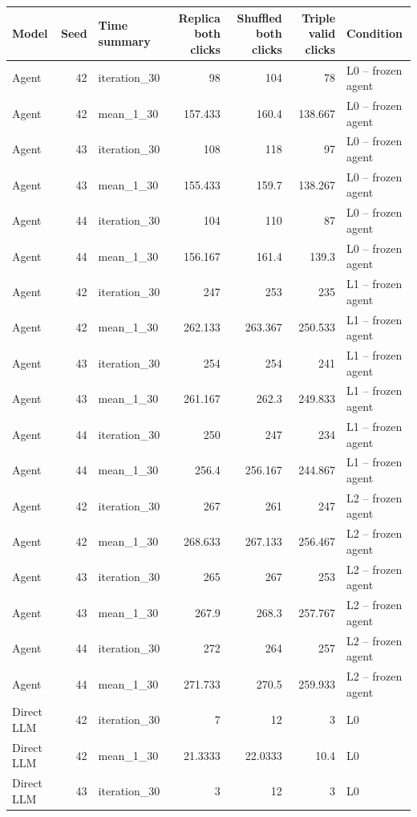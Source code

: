 \begin{table}[htbp!]
\centering
\small
\setlength{\tabcolsep}{3pt}
\renewcommand{\arraystretch}{1.1}
\begin{tabular}{lrlrrrl}
\hline
Model & Seed & Time summary & Replica both clicks & Shuffled both clicks & Triple valid clicks & Condition \\
\hline
Agent & 42 & iteration\_30 & 98 & 104 & 78 & L0 -- frozen agent \\
Agent & 42 & mean\_1\_30 & 157.433 & 160.4 & 138.667 & L0 -- frozen agent \\
Agent & 43 & iteration\_30 & 108 & 118 & 97 & L0 -- frozen agent \\
Agent & 43 & mean\_1\_30 & 155.433 & 159.7 & 138.267 & L0 -- frozen agent \\
Agent & 44 & iteration\_30 & 104 & 110 & 87 & L0 -- frozen agent \\
Agent & 44 & mean\_1\_30 & 156.167 & 161.4 & 139.3 & L0 -- frozen agent \\
Agent & 42 & iteration\_30 & 247 & 253 & 235 & L1 -- frozen agent \\
Agent & 42 & mean\_1\_30 & 262.133 & 263.367 & 250.533 & L1 -- frozen agent \\
Agent & 43 & iteration\_30 & 254 & 254 & 241 & L1 -- frozen agent \\
Agent & 43 & mean\_1\_30 & 261.167 & 262.3 & 249.833 & L1 -- frozen agent \\
Agent & 44 & iteration\_30 & 250 & 247 & 234 & L1 -- frozen agent \\
Agent & 44 & mean\_1\_30 & 256.4 & 256.167 & 244.867 & L1 -- frozen agent \\
Agent & 42 & iteration\_30 & 267 & 261 & 247 & L2 -- frozen agent \\
Agent & 42 & mean\_1\_30 & 268.633 & 267.133 & 256.467 & L2 -- frozen agent \\
Agent & 43 & iteration\_30 & 265 & 267 & 253 & L2 -- frozen agent \\
Agent & 43 & mean\_1\_30 & 267.9 & 268.3 & 257.767 & L2 -- frozen agent \\
Agent & 44 & iteration\_30 & 272 & 264 & 257 & L2 -- frozen agent \\
Agent & 44 & mean\_1\_30 & 271.733 & 270.5 & 259.933 & L2 -- frozen agent \\
Direct LLM & 42 & iteration\_30 & 7 & 12 & 3 & L0 \\
Direct LLM & 42 & mean\_1\_30 & 21.3333 & 22.0333 & 10.4 & L0 \\
Direct LLM & 43 & iteration\_30 & 3 & 12 & 3 & L0 \\

\end{tabular}
\end{table}
